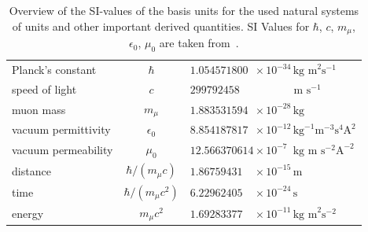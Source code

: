\begin{table}[h]
\caption{\label{tab:units}Overview of the SI-values of the basis units for the used natural systems of units and other important derived quantities. SI Values for $\hbar$, $c$, $m_\mu$, $\epsilon_0$, $\mu_0$ are taken from~\cite{codata2016}.}
\centering\setcellgapes{4pt}\makegapedcells
\begin{tabular}{lc|ll}
\\
Planck's constant &$\hbar$ & \multicolumn{2}{l}{$1.054571800 \phantom{1}\times 10^{-34} \,\text{kg m}^2 \text{s}^{-1}$} \\
speed of light &$c$ & \multicolumn{2}{l}{$299792458\phantom{1} \,\,\phantom{\times 1001 ^{-34}} \text{m s}^{-1}$}\\
muon mass &$m_\mu$ & \multicolumn{2}{l}{$1.883531594\phantom{1} \times 10^{-28} \,\text{kg}$}\\
vacuum permittivity &$\epsilon_0$ & \multicolumn{2}{l}{$8.854187817\phantom{1} \times 10^{-12} \,  \text{kg}^{-1} \text{m}^{-3}\text{s}^4\text{A}^2$}\\
vacuum permeability &$\mu_0$ & \multicolumn{2}{l}{$12.566370614 \times 10^{-7\phantom{1}} \,\text{kg m} \text{ s}^{-2}\text{A}^{-2}$}\\[15pt]
distance & $\hbar/(m_\mu c)$ & $1.86759431\phantom{11}\times 10^{-15}\,\text{m}$\\
time & $\hbar /(m_\mu c^2)$ & $6.22962405\phantom{11}\times 10^{-24}\,\text{s}$\\
energy & $m_\mu c^2$ & $1.69283377\phantom{11}\times 10^{-11}\,\text{kg m}^2\text{s}^{-2}$\\
\end{tabular}
\end{table}
\clearpage
